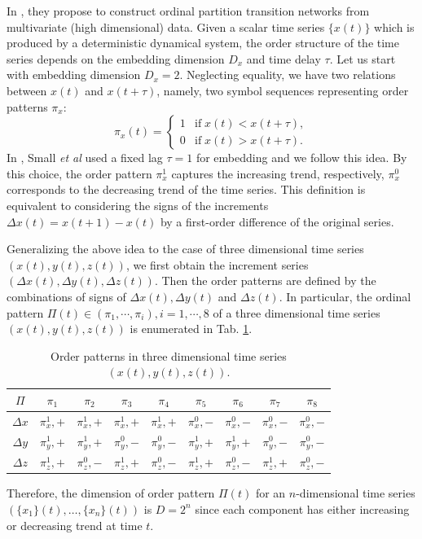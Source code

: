 		In \cite{Zhang2017b}, they propose to construct ordinal partition transition networks from multivariate (high dimensional) data. Given a scalar time series $\{x(t)\}$ which is produced by a deterministic dynamical system, the order structure of the time series depends on the embedding dimension $D_x$ and time delay $\tau$. Let us start with embedding dimension $D_x = 2$. Neglecting equality, we have two relations between $x(t)$ and $x(t + \tau)$, namely, two symbol sequences representing order patterns $\pi_{x}$:
\begin{equation} \label{piX2D_eq}
\pi_{x} (t) =  \begin{cases}
 1 & \text {if} \; x(t) < x(t + \tau), \\
 0 & \text {if} \; x(t) > x(t + \tau). 
\end{cases}
\end{equation}
In \cite{Small2013}, Small {\textit{et al}} used a fixed lag $\tau = 1$ for embedding and we follow this idea. By this choice, the order pattern $\pi_x^{1}$ captures the increasing trend, respectively, $\pi_x^{0}$ corresponds to the decreasing trend of the time series. This definition is equivalent to considering the signs of the increments $\Delta x(t) = x(t+1) - x(t)$ by a first-order difference of the original series. 

		Generalizing the above idea to the case of three dimensional time series $(x(t), y(t), z(t))$, we first obtain the increment series $(\Delta x(t), \Delta y(t), \Delta z(t))$. Then the order patterns are defined by the combinations of signs of $\Delta x(t), \Delta y(t)$ and $\Delta z(t)$. In particular, the ordinal pattern $\Pi(t) \in (\pi_1, \cdots, \pi_i), i = 1, \cdots, 8$ of a three dimensional time series $(x(t), y(t), z(t))$ is enumerated in Tab. \ref{tab:3D}. 
\begin{table}
\centering
\begin{tabular}{|c|c|c|c|c|c|c|c|c|}
\hline
$\Pi$      & $\pi_1$ & $\pi_2$ & $\pi_3$ & $\pi_4$ & $\pi_5$ & $\pi_6$ & $\pi_7$
& $\pi_8$\\
\hline
$\Delta x$ & $\pi_x^{1}, + $ & $\pi_x^{1}, + $ & $\pi_x^{1}, +$ &
$\pi_x^{1}, +$ & $\pi_x^{0}, - $ & $\pi_x^{0}, - $ &
$\pi_x^{0}, -$ & $\pi_x^{0}, -$\\
\hline
$\Delta y$ & $\pi_y^{1}, + $ & $\pi_y^{1}, + $ & $\pi_y^{0}, -$ &
$\pi_y^{0}, -$ & $\pi_y^{1}, + $ & $\pi_y^{1}, + $ &
$\pi_y^{0}, -$ & $\pi_y^{0}, -$\\
\hline
$\Delta z$ & $\pi_z^{1}, + $ & $\pi_z^{0}, - $ & $\pi_z^{1}, +$ &
$\pi_z^{0}, -$ & $\pi_z^{1}, + $ & $\pi_z^{0}, - $ &
$\pi_z^{1}, +$ & $\pi_z^{0}, -$\\
\hline
\end{tabular}
\caption{Order patterns in three dimensional time series $(x(t), y(t), z(t))$. 
\label{tab:3D}}
\end{table}
Therefore, the dimension of order pattern $\Pi(t)$ for an $n$-dimensional time series $(\{x_1\}(t), \ldots, \{x_n\}(t))$ is $D = 2^{n}$ since each component has either increasing or decreasing trend at time $t$. 

